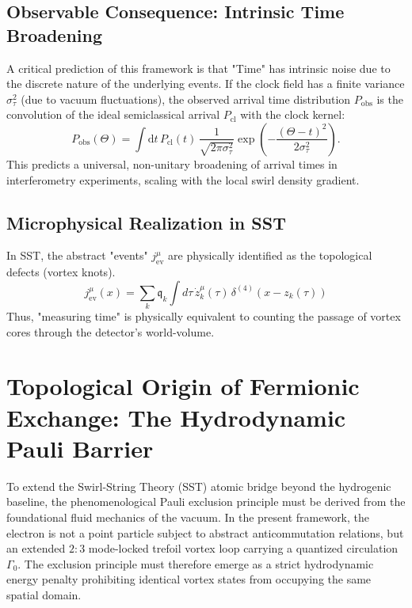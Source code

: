 \documentclass[10pt]{article}
\begin{document}
    \subsection{Observable Consequence: Intrinsic Time Broadening}
        A critical prediction of this framework is that "Time" has intrinsic noise due to the discrete nature of the underlying events.
        If the clock field has a finite variance $\sigma_\tau^2$ (due to vacuum fluctuations), the observed arrival time distribution $P_{\mathrm{obs}}$ is the convolution of the ideal semiclassical arrival $P_{\mathrm{cl}}$ with the clock kernel:
        \begin{equation}
            P_{\mathrm{obs}}(\Theta) = \int \mathrm{d}t \, P_{\mathrm{cl}}(t) \, \frac{1}{\sqrt{2\pi\sigma_\tau^2}} \exp\left( -\frac{(\Theta - t)^2}{2\sigma_\tau^2} \right).
        \end{equation}
        This predicts a universal, non-unitary broadening of arrival times in interferometry experiments, scaling with the local swirl density gradient.

    \subsection{Microphysical Realization in SST}
        In SST, the abstract "events" $j_{\mathrm{ev}}^\mu$ are physically identified as the topological defects (vortex knots).
        \begin{equation}
            j_{\mathrm{ev}}^\mu(x) = \sum_{k} \mathfrak{q}_k \int d\tau \, \dot{z}_k^\mu(\tau) \, \delta^{(4)}(x - z_k(\tau))
        \end{equation}
        Thus, "measuring time" is physically equivalent to counting the passage of vortex cores through the detector's world-volume.
    
    
    \section{Topological Origin of Fermionic Exchange: The Hydrodynamic Pauli Barrier}
    
    To extend the Swirl-String Theory (SST) atomic bridge beyond the hydrogenic baseline, the phenomenological Pauli exclusion principle must be derived from the foundational fluid mechanics of the vacuum. In the present framework, the electron is not a point particle subject to abstract anticommutation relations, but an extended $2{:}3$ mode-locked trefoil vortex loop carrying a quantized circulation $\Gamma_0$. The exclusion principle must therefore emerge as a strict hydrodynamic energy penalty prohibiting identical vortex states from occupying the same spatial domain.
    
\end{document}
